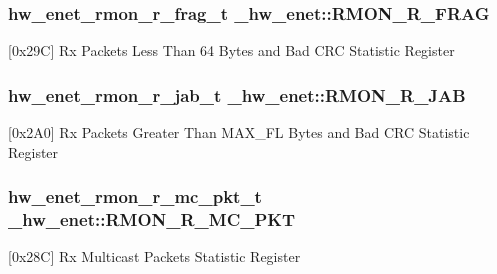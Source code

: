 \subsubsection[{\texorpdfstring{R\+M\+O\+N\+\_\+\+R\+\_\+\+F\+R\+AG}{RMON_R_FRAG}}]{ {\bf hw\+\_\+enet\+\_\+rmon\+\_\+r\+\_\+frag\+\_\+t} \+\_\+hw\+\_\+enet\+::\+R\+M\+O\+N\+\_\+\+R\+\_\+\+F\+R\+AG}\hypertarget{struct__hw__enet_aef5ee941581c914d936572ef957dedae}{}\label{struct__hw__enet_aef5ee941581c914d936572ef957dedae}
\mbox{[}0x29C\mbox{]} Rx Packets Less Than 64 Bytes and Bad C\+RC Statistic Register 
\subsubsection[{\texorpdfstring{R\+M\+O\+N\+\_\+\+R\+\_\+\+J\+AB}{RMON_R_JAB}}]{ {\bf hw\+\_\+enet\+\_\+rmon\+\_\+r\+\_\+jab\+\_\+t} \+\_\+hw\+\_\+enet\+::\+R\+M\+O\+N\+\_\+\+R\+\_\+\+J\+AB}\hypertarget{struct__hw__enet_a5b8bdaa740eace77903b7e078fe00b17}{}\label{struct__hw__enet_a5b8bdaa740eace77903b7e078fe00b17}
\mbox{[}0x2\+A0\mbox{]} Rx Packets Greater Than M\+A\+X\+\_\+\+FL Bytes and Bad C\+RC Statistic Register 
\subsubsection[{\texorpdfstring{R\+M\+O\+N\+\_\+\+R\+\_\+\+M\+C\+\_\+\+P\+KT}{RMON_R_MC_PKT}}]{ {\bf hw\+\_\+enet\+\_\+rmon\+\_\+r\+\_\+mc\+\_\+pkt\+\_\+t} \+\_\+hw\+\_\+enet\+::\+R\+M\+O\+N\+\_\+\+R\+\_\+\+M\+C\+\_\+\+P\+KT}\hypertarget{struct__hw__enet_a74e87693fe858d33b6dea0e5f4cab031}{}\label{struct__hw__enet_a74e87693fe858d33b6dea0e5f4cab031}
\mbox{[}0x28C\mbox{]} Rx Multicast Packets Statistic Register 
